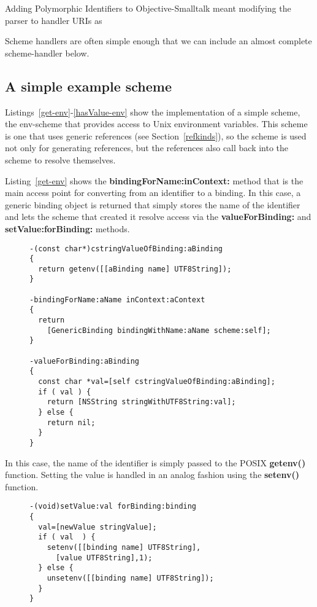 \documentclass[preprint,authoryear]{llncs}
\begin{document}
Adding Polymorphic Identifiers to Objective-Smalltalk meant modifying the parser to handler URIs as 

Scheme handlers are often simple enough that we can include an almost complete scheme-handler below.

\subsection{A simple example scheme}

Listings~\ref{get-env}-\ref{hasValue-env} show the implementation of a simple scheme,
the env-scheme that provides access to Unix environment variables.  This scheme is
one that uses generic references (see Section~\ref{refkinds}), so the scheme is used
not only for generating references, but the references also call back into the scheme
to resolve themselves.

Listing~\ref{get-env} 
shows the {\bf bindingForName:inContext:} method that is the main access point for
converting from an identifier to a binding.  In this case, a generic binding object is returned
that simply stores the name of the identifier and lets the scheme that created it resolve
access via the {\bf valueForBinding:} and {\bf setValue:forBinding:} methods.


\begin{figure}[htbp]
\begin{lstlisting}[style=L,label=get-env,caption=Basic lookup in env: scheme.]
-(const char*)cstringValueOfBinding:aBinding
{
  return getenv([[aBinding name] UTF8String]);
}

-bindingForName:aName inContext:aContext
{
  return
    [GenericBinding bindingWithName:aName scheme:self];
}

-valueForBinding:aBinding
{
  const char *val=[self cstringValueOfBinding:aBinding];
  if ( val ) {
    return [NSString stringWithUTF8String:val];
  } else {
    return nil;
  }
}
\end{lstlisting}
\end{figure}

In this case, the name of the identifier is simply passed to the POSIX {\bf getenv()} function.
Setting the value is handled in an analog fashion using the {\bf setenv()} function.


\begin{figure}[htbp]
\begin{lstlisting}[style=L,label=setvalue-env,caption=Set value in env: scheme.]
-(void)setValue:val forBinding:binding
{
  val=[newValue stringValue];
  if ( val  ) {
    setenv([[binding name] UTF8String],
      [value UTF8String],1);
  } else {
    unsetenv([[binding name] UTF8String]);
  }
}
\end{lstlisting}
\end{figure}
\end{document}
